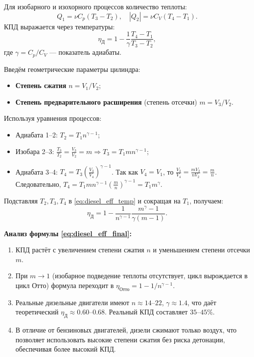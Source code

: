 \begin{theorem}
Для изобарного и изохорного процессов количество теплоты:
\begin{equation}
    Q_1 = \nu C_p (T_3 - T_2), \quad |Q_2| = \nu C_V (T_4 - T_1).
\end{equation}
КПД выражается через температуры:
\begin{equation}
    \eta_{\text{Д}} = 1 - \frac{1}{\gamma} \frac{T_4 - T_1}{T_3 - T_2}, \label{eq:diesel_eff_temp}
\end{equation}
где $\gamma = C_p/C_V$ --- показатель адиабаты.
\par\noindent Введём геометрические параметры цилиндра:
\begin{itemize}
    \item \textbf{Степень сжатия} $n = V_1/V_2$;
    \item \textbf{Степень предварительного расширения} (степень отсечки) $m = V_3/V_2$.
\end{itemize}
Используя уравнения процессов:
\begin{itemize}
    \item Адиабата 1--2: $T_2 = T_1 n^{\gamma-1}$;
    \item Изобара 2--3: $\frac{T_3}{T_2} = \frac{V_3}{V_2} = m \Rightarrow T_3 = T_1 m n^{\gamma-1}$;
    \item Адиабата 3--4: $T_4 = T_3 \left(\frac{V_3}{V_4}\right)^{\gamma-1}$. Так как $V_4 = V_1$, то $\frac{V_3}{V_4} = \frac{m V_2}{n V_2} = \frac{m}{n}$. Следовательно, $T_4 = T_1 m n^{\gamma-1} \left(\frac{m}{n}\right)^{\gamma-1} = T_1 m^\gamma$.
\end{itemize}
Подставляя $T_2, T_3, T_4$ в \eqref{eq:diesel_eff_temp} и сокращая на $T_1$, получаем:
\begin{equation}
    \eta_{\text{Д}} = 1 - \frac{1}{n^{\gamma-1}} \frac{m^\gamma - 1}{\gamma(m - 1)}. \label{eq:diesel_eff_final}
\end{equation}
\end{theorem}

\begin{property}
\textbf{Анализ формулы \eqref{eq:diesel_eff_final}:}
\begin{enumerate}
    \item КПД растёт с увеличением степени сжатия $n$ и уменьшением степени отсечки $m$.
    \item При $m \to 1$ (изобарное подведение теплоты отсутствует, цикл вырождается в цикл Отто) формула переходит в $\eta_{\text{Отто}} = 1 - 1/n^{\gamma-1}$.
    \item Реальные дизельные двигатели имеют $n \approx 14 \text{--} 22$, $\gamma \approx 1.4$, что даёт теоретический $\eta_{\text{Д}} \approx 0.60 \text{--} 0.68$. Реальный КПД составляет $35 \text{--} 45\%$.
    \item В отличие от бензиновых двигателей, дизели сжимают только воздух, что позволяет использовать высокие степени сжатия без риска детонации, обеспечивая более высокий КПД.
\end{enumerate}
\end{property}

